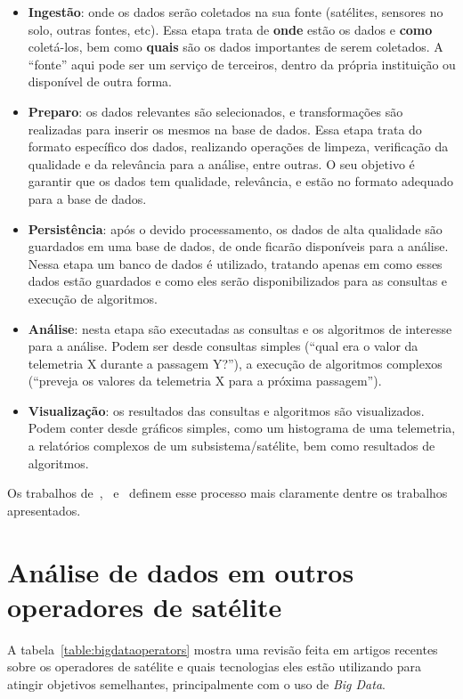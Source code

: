\begin{itemize}
	\item \textbf{Ingestão}: onde os dados serão coletados na sua fonte (satélites, sensores no solo, outras fontes, etc).
	      Essa etapa trata de \textbf{onde} estão os dados e \textbf{como} coletá-los, bem como \textbf{quais} são os dados importantes de serem coletados.
	      A ``fonte'' aqui pode ser um serviço de terceiros, dentro da própria instituição ou disponível de outra forma.
	\item \textbf{Preparo}: os dados relevantes são selecionados, e transformações são realizadas para inserir os mesmos na base de dados.
	      Essa etapa trata do formato específico dos dados, realizando operações de limpeza, verificação da qualidade e da relevância para a análise, entre outras.
	      O seu objetivo é garantir que os dados tem qualidade, relevância, e estão no formato adequado para a base de dados.
	\item \textbf{Persistência}: após o devido processamento, os dados de alta qualidade são guardados em uma base de dados, de onde ficarão disponíveis para a análise.
	      Nessa etapa um banco de dados é utilizado, tratando apenas em como esses dados estão guardados e como eles serão disponibilizados para as consultas e execução de algoritmos.
	\item \textbf{Análise}: nesta etapa são executadas as consultas e os algoritmos de interesse para a análise.
	      Podem ser desde consultas simples (``qual era o valor da telemetria X durante a passagem Y?''), a execução de algoritmos complexos (``preveja os valores da telemetria X para a próxima passagem'').
	\item \textbf{Visualização}: os resultados das consultas e algoritmos são visualizados.
	      Podem conter desde gráficos simples, como um histograma de uma telemetria, a relatórios complexos de um subsistema/satélite, bem como resultados de algoritmos.
\end{itemize}

Os trabalhos de~\cite{zhangBigDataFramework2017},~\cite{mateikUsingBigData2017} e~\cite{boussoufBigDataBased2018} definem esse processo mais claramente dentre os trabalhos apresentados.

\section{Análise de dados em outros operadores de satélite}\label{ch:corr:ops}

A tabela~\ref{table:bigdataoperators} mostra uma revisão feita em artigos recentes sobre os operadores de satélite e quais tecnologias eles estão utilizando para atingir objetivos semelhantes, principalmente com o uso de \textit{Big Data}.

